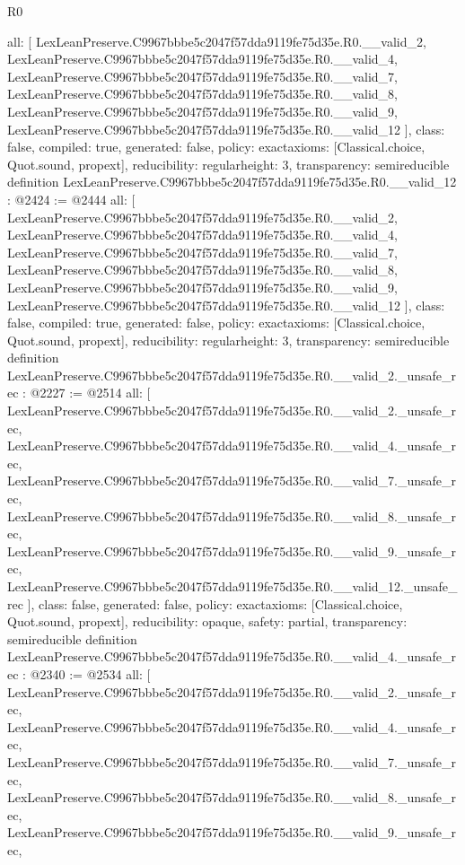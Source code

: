 \begin{lexlean}{R0}
\begin{coremodule}
{  all: [
    LexLeanPreserve.C9967bbbe5c2047f57dda9119fe75d35e.R0.__valid_2,
    LexLeanPreserve.C9967bbbe5c2047f57dda9119fe75d35e.R0.__valid_4,
    LexLeanPreserve.C9967bbbe5c2047f57dda9119fe75d35e.R0.__valid_7,
    LexLeanPreserve.C9967bbbe5c2047f57dda9119fe75d35e.R0.__valid_8,
    LexLeanPreserve.C9967bbbe5c2047f57dda9119fe75d35e.R0.__valid_9,
    LexLeanPreserve.C9967bbbe5c2047f57dda9119fe75d35e.R0.__valid_12
  ],
  class: false,
  compiled: true,
  generated: false,
  policy: exact{axioms: [Classical.choice, Quot.sound, propext]},
  reducibility: regular{height: 3},
  transparency: semireducible
}
definition LexLeanPreserve.C9967bbbe5c2047f57dda9119fe75d35e.R0.__valid_12 : @2424 := @2444 {
  all: [
    LexLeanPreserve.C9967bbbe5c2047f57dda9119fe75d35e.R0.__valid_2,
    LexLeanPreserve.C9967bbbe5c2047f57dda9119fe75d35e.R0.__valid_4,
    LexLeanPreserve.C9967bbbe5c2047f57dda9119fe75d35e.R0.__valid_7,
    LexLeanPreserve.C9967bbbe5c2047f57dda9119fe75d35e.R0.__valid_8,
    LexLeanPreserve.C9967bbbe5c2047f57dda9119fe75d35e.R0.__valid_9,
    LexLeanPreserve.C9967bbbe5c2047f57dda9119fe75d35e.R0.__valid_12
  ],
  class: false,
  compiled: true,
  generated: false,
  policy: exact{axioms: [Classical.choice, Quot.sound, propext]},
  reducibility: regular{height: 3},
  transparency: semireducible
}
definition LexLeanPreserve.C9967bbbe5c2047f57dda9119fe75d35e.R0.__valid_2._unsafe_rec : @2227 := @2514 {
  all: [
    LexLeanPreserve.C9967bbbe5c2047f57dda9119fe75d35e.R0.__valid_2._unsafe_rec,
    LexLeanPreserve.C9967bbbe5c2047f57dda9119fe75d35e.R0.__valid_4._unsafe_rec,
    LexLeanPreserve.C9967bbbe5c2047f57dda9119fe75d35e.R0.__valid_7._unsafe_rec,
    LexLeanPreserve.C9967bbbe5c2047f57dda9119fe75d35e.R0.__valid_8._unsafe_rec,
    LexLeanPreserve.C9967bbbe5c2047f57dda9119fe75d35e.R0.__valid_9._unsafe_rec,
    LexLeanPreserve.C9967bbbe5c2047f57dda9119fe75d35e.R0.__valid_12._unsafe_rec
  ],
  class: false,
  generated: false,
  policy: exact{axioms: [Classical.choice, Quot.sound, propext]},
  reducibility: opaque{},
  safety: partial,
  transparency: semireducible
}
definition LexLeanPreserve.C9967bbbe5c2047f57dda9119fe75d35e.R0.__valid_4._unsafe_rec : @2340 := @2534 {
  all: [
    LexLeanPreserve.C9967bbbe5c2047f57dda9119fe75d35e.R0.__valid_2._unsafe_rec,
    LexLeanPreserve.C9967bbbe5c2047f57dda9119fe75d35e.R0.__valid_4._unsafe_rec,
    LexLeanPreserve.C9967bbbe5c2047f57dda9119fe75d35e.R0.__valid_7._unsafe_rec,
    LexLeanPreserve.C9967bbbe5c2047f57dda9119fe75d35e.R0.__valid_8._unsafe_rec,
    LexLeanPreserve.C9967bbbe5c2047f57dda9119fe75d35e.R0.__valid_9._unsafe_rec,
}
\end{coremodule}
\end{lexlean}
